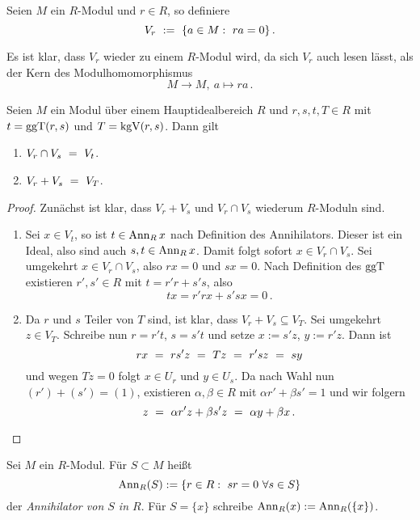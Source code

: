 \begin{definition}
  \label{def:V_r}
  Seien $M$ ein $R$-Modul und $r \in R$, so definiere
  \[ V_r \ :=\  \{ a\in M:\ ra = 0\}\,.\]
\end{definition}


\begin{bemerkung}
  Es ist klar, dass $V_r$ wieder zu einem $R$-Modul wird, da sich $V_r$ auch
  lesen lässt, als der Kern des Modulhomomorphismus
  \[ M\to M,\ a \mapsto ra\,.\]
\end{bemerkung}

\begin{satz}
  \label{satz:schnitt_plus_vs}
  Seien $M$ ein Modul über einem Hauptidealbereich $R$ und $r,s,t,T\in R$ mit 
  $t = \operatorname{ggT}(r,s)$ und $T = \operatorname{kgV}(r,s)$. Dann gilt
  \begin{enumerate}
    \item $V_r \cap V_s \ =\  V_t$.
    \item $V_r + V_s \ =\  V_T$.
  \end{enumerate}
\end{satz}
\begin{proof}
  Zunächst ist klar, dass $V_r+V_s$ und $V_r\cap V_s$ wiederum $R$-Moduln sind.
  \begin{enumerate}
    \item Sei $x\in V_t$, so ist $t \in \operatorname{Ann}_Rx$ nach Definition des
      Annihilators. Dieser ist ein Ideal, also sind auch $s,t\in \operatorname{Ann}_Rx$.
      Damit folgt sofort $x \in V_r\cap V_s$.
      Sei umgekehrt $x \in V_r \cap V_s$, also $rx = 0$ und $sx = 0$. 
      Nach Definition des $\operatorname{ggT}$ existieren $r',s'\in R$ mit 
      $t = r'r + s's$, also 
      \[ tx = r'rx + s'sx = 0\,.\]
    \item Da $r$ und $s$ Teiler von $T$ sind, ist klar, dass
      $V_r+V_s \subseteq V_T$. Sei umgekehrt $z\in V_T$.
      Schreibe nun $r = r't$, $s = s't$ und setze
      $x := s'z$, $y:=r'z$. Dann ist 
      \[ rx \ =\  rs'z \ =\  Tz \ =\  r'sz \ =\  sy \]
      und wegen $Tz = 0$ folgt $x\in U_r$ und $y \in U_s$. Da nach Wahl nun
      $(r')+(s') = (1)$, existieren $\alpha,\beta\in R$ mit 
      $\alpha r' + \beta s' = 1$ und wir folgern
      \[ z \ =\  \alpha r'z + \beta s'z \ =\  \alpha y + \beta x \,.\]
  \end{enumerate}
\end{proof}

\begin{definition}[Annihilator]
  Sei $M$ ein $R$-Modul. Für $S\subset M$ heißt
  \[ \Ann_R(S) := \{ r \in R:\ sr = 0\ \forall s\in S\}\]
  der \emph{Annihilator von $S$ in $R$}. 
  Für $S= \{x\}$ schreibe $\operatorname{Ann}_R(x) := \operatorname{Ann}_R(\{x\})$.
\end{definition}

